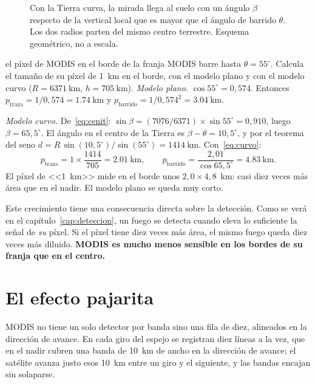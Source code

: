 \begin{figure}[ht]
\centering

\caption{Con la Tierra curva, la mirada llega al suelo con un ángulo $\beta$ respecto de la
vertical local que es mayor que el ángulo de barrido $\theta$. Los dos radios parten
del mismo centro terrestre. Esquema geométrico, no a escala.}
\label{fig:curva}
\end{figure}

\begin{ejemplo}{el píxel de MODIS en el borde de la franja}
MODIS barre hasta $\theta = 55^\circ$. Calcula el tamaño de su píxel de 1~km en el borde, con el
modelo plano y con el modelo curvo ($R = \SI{6371}{\kilo\metre}$, $h = \SI{705}{\kilo\metre}$).
\solucion \emph{Modelo plano.} $\cos 55^\circ = 0{,}574$. Entonces
$p_{\text{traza}} = 1/0{,}574 = \SI{1.74}{\kilo\metre}$ y
$p_{\text{barrido}} = 1/0{,}574^2 = \SI{3.04}{\kilo\metre}$.

\emph{Modelo curvo.} De~\eqref{eq:cenit}: $\sin\beta = (7076/6371)\times\sin 55^\circ =
0{,}910$, luego $\beta = 65{,}5^\circ$. El ángulo en el centro de la Tierra es $\beta - \theta =
10{,}5^\circ$, y por el teorema del seno $d = R\,\sin(10{,}5^\circ)/\sin(55^\circ) =
\SI{1414}{\kilo\metre}$. Con~\eqref{eq:curvo}:
\[
 p_{\text{traza}} = 1\times\frac{1414}{705} = \SI{2.01}{\kilo\metre},
 \qquad
 p_{\text{barrido}} = \frac{2{,}01}{\cos 65{,}5^\circ} = \SI{4.83}{\kilo\metre}.
\]
El píxel de <<1~km>> mide en el borde unos $2{,}0 \times 4{,}8$~km: casi diez veces más área que
en el nadir. El modelo plano se queda muy corto.
\end{ejemplo}

Este crecimiento tiene una consecuencia directa sobre la detección. Como se verá en el
capítulo~\ref{cap:deteccion}, un fuego se detecta cuando eleva lo suficiente la señal de
\emph{su} píxel. Si el píxel tiene diez veces más área, el mismo fuego queda diez veces más
diluido. \textbf{MODIS es mucho menos sensible en los bordes de su franja que en el centro.}

\section{El efecto pajarita}

MODIS no tiene un solo detector por banda sino una fila de diez, alineados en la dirección de
avance. En cada giro del espejo se registran diez líneas a la vez, que en el nadir cubren una
banda de 10~km de ancho en la dirección de avance; el satélite avanza justo esos 10~km entre un
giro y el siguiente, y las bandas encajan sin solaparse.

